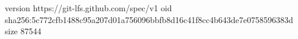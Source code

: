 version https://git-lfs.github.com/spec/v1
oid sha256:5c772cfb1488c95a207d01a756096bbfb8d16c41f8cc4b643de7e0758596383d
size 87544
